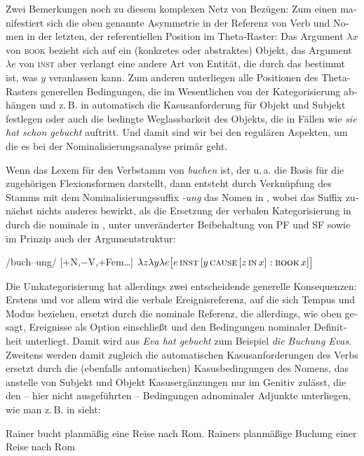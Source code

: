 \documentclass[output=paper,colorlinks,citecolor=brown]{langscibook}
\begin{document}
\begin{otherlanguage}{german}
Zwei Bemerkungen noch zu diesem komplexen Netz von Bezügen: Zum einen manifestiert sich die oben genannte Asymmetrie in der Referenz von Verb und Nomen in der letzten, der referentiellen Position im Theta-Raster: Das Argument $\lambda x$ von \textsc{book} bezieht sich auf ein (konkretes oder abstraktes) Objekt, das Argument $\lambda e$ von \textsc{inst} aber verlangt eine andere Art von Entität, die durch das bestimmt ist, was $y$ veranlassen kann. Zum anderen unterliegen alle Positionen des Theta-Rasters generellen Bedingungen, die im Wesentlichen von der Kategorisierung abhängen und z.\,B. in  automatisch die Kasusanforderung für Objekt und Subjekt festlegen oder auch die bedingte Weglassbarkeit des Objekts, die in Fällen wie \textit{sie hat schon gebucht} auftritt. Und damit sind wir bei den regulären Aspekten, um die es bei der Nominalisierungsanalyse primär geht.

\newpage
Wenn  das Lexem für den Verbstamm von \textit{buchen} ist, der u.\,a. die Basis für die zugehörigen Flexionsformen darstellt, dann entsteht durch Verknüpfung des Stamms mit dem Nominalisierungssuffix \textit{-ung} das Nomen in , wobei das Suffix zunächst nichts anderes bewirkt, als die Ersetzung der verbalen Kategorisierung in  durch die nominale in , unter unveränderter Beibehaltung von PF und SF sowie im Prinzip auch der Argumentstruktur:

\ea /buch--ung/ [$+$N,$-$V,$+$Fem\dots] $\lambda z \lambda y \lambda e \big\lbrack e\, \textsc{inst}\, [y\, \textsc{cause}\, [z\, \textsc{in}\, x] : \textsc{book}\, x ]\big\rbrack$
\label{ex:14}
\z

\noindent Die Umkategorisierung hat allerdings zwei entscheidende generelle Konsequenzen: Erstens und vor allem wird die verbale Ereignisreferenz, auf die sich Tempus und Modus beziehen, ersetzt durch die nominale Referenz, die allerdings, wie oben gesagt, Ereignisse als Option einschließt und den Bedingungen nominaler Definitheit unterliegt. Damit wird aus \textit{Eva hat gebucht} zum Beispiel \textit{die Buchung Evas}. Zweitens werden damit zugleich die automatischen Kasusanforderungen des Verbs ersetzt durch die (ebenfalls automatischen) Kasusbedingungen des Nomens, das anstelle von Subjekt und Objekt Kasusergänzungen nur im Genitiv zulässt, die den -- hier nicht ausgeführten -- Bedingungen adnominaler Adjunkte unterliegen, wie man z.\,B. in  sieht:

\ea 
\ea Rainer bucht planmäßig eine Reise nach Rom.
\ex Rainers planmäßige Buchung einer Reise nach Rom
\z
\label{ex:15}
\z


\end{otherlanguage}
\end{document}
